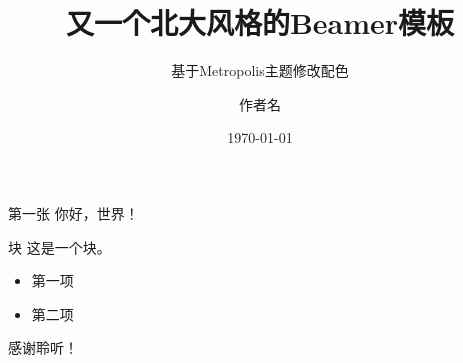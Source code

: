 \documentclass[10pt]{beamer}
\title{又一个北大风格的Beamer模板}
\subtitle{基于Metropolis主题修改配色}
\date{\today}
\author[短作者名]{作者名}
\institute{北京大学XX学院}
\begin{document}
  \maketitle

  \begin{frame}{第一张}
    你好，世界！
    \begin{block}{块}
        这是一个块。
    \end{block}
    
    \begin{itemize}
        \item 第一项
        \item 第二项
    \end{itemize}
  \end{frame}
  
  
  \begin{frame}[standout]
    感谢聆听！
  \end{frame}
\end{document}
